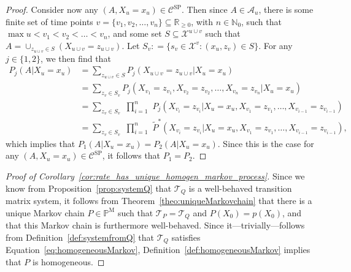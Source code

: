 \documentclass[10pt,a4paper]{paper}
\theoremstyle{definition}
\newcommand{\nats}{\mathbb{N}}
\newcommand{\reals}{\mathbb{R}}
\newcommand{\states}{\mathcal{X}}
\newcommand{\processes}{\mathbb{P}}
\newcommand{\mprocesses}{\processes^{\mathrm{M}}}
\newcommand{\coloneqq}{:\!=}
\begin{document}
\begin{proof}
Consider now any $(A,X_u=x_u)\in\mathcal{C}^\mathrm{SP}$. Then since $A\in\mathcal{A}_u$, there is some finite set of time points $v=\{v_1,v_2,\dots,v_n\}\subseteq\reals_{\geq0}$, with $n\in\nats_0$, such that $\max u<v_1<v_2<\dots<v_n$, and some set $S\subseteq\states^{u\cup v}$ such that $A=\cup_{z_{u\cup v}\in S}(X_{u\cup v}=z_{u\cup v})$. 
Let $S_v\coloneqq\{s_v\in\states^v\colon (x_u,z_v)\in S\}$.
For any $j\in\{1,2\}$, we then find that
\begin{align*}
P_j(A\vert X_u=x_u)
&=\sum_{z_{u\cup v}\in S}
P_j(X_{u\cup v}=z_{u\cup v}\vert X_u=x_u)\\
&=\sum_{z_{v}\in S_v}
P_j(X_{v_1}=z_{v_1}, X_{v_2}=z_{v_2}, \dots, X_{v_n}=z_{v_n}\vert X_u=x_u)\\[-1mm]
&=\sum_{z_{v}\in S_v}
\,\,
\prod_{i=1}^n
\,\,
P_j(X_{v_i}=z_{v_i}\vert X_u=x_u, X_{v_1}=z_{v_1}, \dots, X_{v_{i-1}}=z_{v_{i-1}})\\
&=\sum_{z_{v}\in S_v}
\,\,
\prod_{i=1}^n
\,\,
\tilde{P}^*(X_{v_i}=z_{v_i}\vert X_u=x_u, X_{v_1}=z_{v_1}, \dots, X_{v_{i-1}}=z_{v_{i-1}}),
\end{align*}
which implies that $P_1(A\vert X_u=x_u)=P_2(A\vert X_u=x_u)$. Since this is the case for any $(A,X_u=x_u)\in\mathcal{C}^\mathrm{SP}$, it follows that $P_1=P_2$.
\end{proof}

\begin{proof}[Proof of Corollary~\ref{cor:rate_has_unique_homogen_markov_process}]
Since we know from Proposition~\ref{prop:systemQ} that $\mathcal{T}_Q$ is a well-behaved transition matrix system, it follows from Theorem~\ref{theo:uniqueMarkovchain} that there is a unique Markov chain $P\in\mprocesses$ such that $\mathcal{T}_P=\mathcal{T}_Q$ and $P(X_0)=p(X_0)$, and that this Markov chain is furthermore well-behaved. Since it---trivially---follows from Definition~\ref{def:systemfromQ} that $\mathcal{T}_Q$ satisfies Equation~\eqref{eq:homogeneousMarkov}, Definition~\ref{def:homogeneousMarkov} implies that $P$ is homogeneous.
\end{proof}
\end{document}

